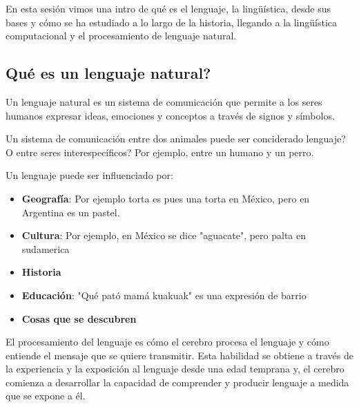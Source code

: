 \documentclass[11pt,letterpaper]{article}
\begin{document}

\portadilla
\newpage



\begin{quick_sum}
    En esta sesión vimos una intro de qué es el lenguaje, la lingüística, 
    desde sus bases y cómo se ha estudiado a lo largo de la historia, 
    llegando a la lingüística computacional y el procesamiento de lenguaje 
    natural.
\end{quick_sum}

\subsection*{Qué es un lenguaje natural?}
Un lenguaje natural es un sistema de comunicación que permite a los
seres humanos expresar ideas, emociones y conceptos a través de signos
y símbolos.

\begin{idear}
    Un sistema de comunicación entre dos animales puede ser conciderado lenguaje?
    O entre seres interespecíficos? Por ejemplo, entre un humano y un perro.
\end{idear}

Un lenguaje puede ser influenciado por:

\begin{itemize}
    \item \textbf{Geografía}: Por ejemplo torta es pues una torta en México, pero en Argentina es un pastel.
    \item \textbf{Cultura}: Por ejemplo, en México se dice "aguacate", pero palta en sudamerica
    \item \textbf{Historia}
    \item \textbf{Educación}: "Qué pató mamá kuakuak" es una expresión de barrio
    \item \textbf{Cosas que se descubren}
\end{itemize}

\vspace{2em}

El procesamiento del lenguaje es cómo el cerebro procesa el lenguaje y cómo entiende
el mensaje que se quiere transmitir. Esta habilidad se obtiene a través de la experiencia y la exposición al 
lenguaje desde una edad temprana y, el cerebro comienza a desarrollar la capacidad de comprender y producir lenguaje a medida que se expone a él.
\end{document}
